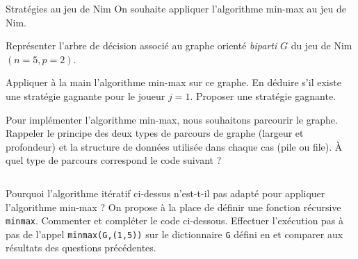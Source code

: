 \begin{exo}[PC][1][TD]{Stratégies au jeu de Nim}
On souhaite appliquer l'algorithme min-max au jeu de Nim.
\begin{quest}
  \item Représenter l'arbre de décision associé au graphe orienté \emph{biparti} $G$ du jeu de Nim $(n=5,p=2)$.
  \item Appliquer à la main l’algorithme min-max sur ce graphe. En déduire s’il existe une stratégie gagnante pour le joueur $j=1$. Proposer une stratégie gagnante.
  \item Pour implémenter l’algorithme min-max, nous souhaitons parcourir le graphe. Rappeler le principe des deux types de parcours de graphe (largeur et profondeur) et la structure de données utilisée dans chaque cas (pile ou file). À quel type de parcours correspond le code suivant ?
  \inputminted[linenos=true,frame=single]{python}{\pathtoexos/Info/Scripts/minmax_nim_longueur.py}
  \item Pourquoi l’algorithme itératif ci-dessus n’est-t-il pas adapté pour appliquer l’algorithme min-max ? On propose à la place de définir une fonction récursive \texttt{minmax}. Commenter et compléter le code ci-dessous. Effectuer l'exécution pas à pas de l'appel \texttt{minmax(G,(1,5))} sur le dictionnaire \texttt{G} défini en  et comparer aux résultats des questions précédentes.
    \inputminted[linenos=true,frame=single]{python}{\pathtoexos/Info/Scripts/minmax_nim.py}

\end{quest}


\end{exo}
